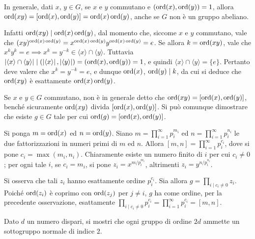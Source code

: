 \documentclass[11pt]{scrartcl}
\begin{document}
	\begin{remark}
		In generale, dati $x$, $y\in G$, se $x$ e $y$ commutano e $(\operatorname{ord}(x),\operatorname{ord}(y)) = 1$, allora 
		$\operatorname{ord}(xy) = [\operatorname{ord}(x), \operatorname{ord}(y)] = \operatorname{ord}(x) \operatorname{ord}(y)$, anche se $G$ non è un gruppo abeliano. \medskip
		
		Infatti $\operatorname{ord}(xy) \mid \operatorname{ord}(x) \operatorname{ord}(y)$, dal momento
		che, siccome $x$ e $y$ commutano, vale che $(xy)^{\operatorname{ord}(x) \operatorname{ord}(y)} = x^{\operatorname{ord}(x) \operatorname{ord}(y)} y^{\operatorname{ord}(x) \operatorname{ord}(y)} = e$.
		Se allora $k = \operatorname{ord}(xy)$, vale che
		$x^k y^k = e \implies x^k = y^{-k} \in \langle x \rangle \cap \langle y \rangle$.
		Tuttavia $\left\lvert \langle x \rangle \cap \langle y \rangle \right\rvert \mid
		(\left\lvert \langle x \rangle \right\rvert, \left\lvert \langle y \rangle \right\rvert) = (\operatorname{ord}(x), \operatorname{ord}(y)) =
		1$, e quindi $\langle x \rangle \cap \langle y \rangle = \{e\}$. Pertanto
		deve valere che $x^k = y^{-k} = e$, e dunque
		$\operatorname{ord}(x)$, $\operatorname{ord}(y) \mid k$, da cui si deduce che
		$\operatorname{ord}(xy)$ è esattamente $\operatorname{ord}(x) \operatorname{ord}(y)$.
	\end{remark}
	
	\begin{remark}
		Se $x$ e $y \in G$ commutano, non è in generale detto che
		$\operatorname{ord}(xy) = [\operatorname{ord}(x), \operatorname{ord}(y)]$, benché sicuramente
		$\operatorname{ord}(xy)$ divida $[\operatorname{ord}(x), \operatorname{ord}(y)]$. Si può comunque dimostrare che esiste
		$g \in G$ tale per cui $\operatorname{ord}(g) = [\operatorname{ord}(x), \operatorname{ord}(y)]$. \medskip
		
		Si ponga $m = \operatorname{ord}(x)$ ed $n = \operatorname{ord}(y)$. Siano $m = \prod_{i = 1}^\infty p_i^{m_i}$
		ed $n = \prod_{i = 1}^\infty p_i^{n_i}$ le due fattorizzazioni in numeri primi
		di $m$ ed $n$. Allora $[m, n] = \prod_{i = 1}^\infty p_i^{c_i}$,
		dove si pone $c_i = \max(m_i, n_i)$. Chiaramente esiste un numero finito di
		$i$ per cui $c_i \neq 0$; per ogni tale $i$, se $c_i = m_i$, si pone
		$z_i = x^{m /p_i^{m_i}}$, altrimenti
		$z_i = y^{n / p_i^{n_i}}$. \medskip
		
		
		Si osserva che tali $z_i$ hanno esattamente ordine $p_i^{c_i}$.
		Sia allora $g = \prod_{i \mid c_i \neq 0} z_i$. Poiché $\operatorname{ord}(z_i)$ è coprimo
		con $\operatorname{ord}(z_j)$ per $j \neq i$, $g$ ha come ordine, per la precedente osservazione,
		esattamente $\prod_{i \mid c_i \neq 0} p_i^{c_i} = \prod_{i = 1}^\infty p_i^{c_i} =
		[m, n]$.
	\end{remark}
	
	\begin{exercise}
		\label{ex1.48}
		Dato $d$ un numero dispari, si mostri che ogni gruppo di ordine $2d$ ammette
		un sottogruppo normale di indice $2$.
	\end{exercise}
	
\end{document}
